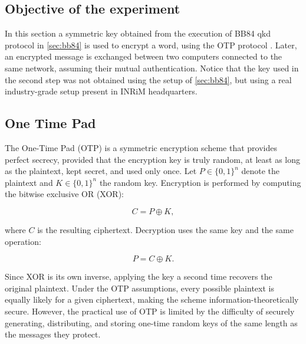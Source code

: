 \subsection{Objective of the experiment}

In this section a symmetric key obtained from the execution
of BB84 qkd protocol in \cref{sec:bb84} is used to encrypt a word,
using the OTP protocol \cite{OTPShannon}.
Later, an encrypted message is exchanged between two computers connected to the
same network, assuming their mutual authentication. Notice that the
key used in the
second step was not obtained using the setup of
\cref{sec:bb84}, but using a
real industry-grade setup present in INRiM headquarters.

\subsection{One Time Pad}

The One-Time Pad (OTP) is a symmetric encryption scheme that provides
perfect secrecy, provided that the encryption key is truly random, at
least as long as the plaintext, kept secret, and used only once. Let
$P \in \{0,1\}^n$ denote the plaintext and $K \in \{0,1\}^n$ the random key.
Encryption is performed by computing the bitwise exclusive OR (XOR):

\[
  C = P \oplus K,
\]

where $C$ is the resulting ciphertext. Decryption uses the same key and the
same operation:

\[
  P = C \oplus K.
\]

Since XOR is its own inverse, applying the key a second time recovers the
original plaintext. Under the OTP assumptions, every possible plaintext is
equally likely for a given ciphertext, making the scheme
information-theoretically
secure. However, the practical use of OTP is limited by the difficulty of
securely generating, distributing, and storing one-time random keys of the same
length as the messages they protect.